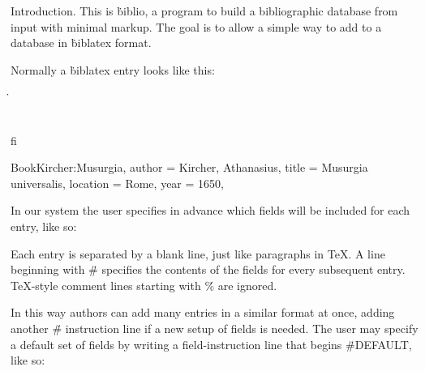 

Introduction.
This is \.{biblio}, a program to build a bibliographic database from input with
minimal markup.
The goal is to allow a simple way to add to a database in \.{biblatex} format.

Normally a \.{biblatex} entry looks like this:

\.{\\fi

Book{Kircher:Musurgia,
author   = {Kircher, Athanasius},
title    = {Musurgia universalis},
location = {Rome},
year     = 1650,
}}

In our system the user specifies in advance which fields will be included for
each entry, like so:


Each entry is separated by a blank line, just like paragraphs in \TeX.
A line beginning with \.{\#} specifies the contents of the fields for every
subsequent entry.
\TeX-style comment lines starting with \.{\%} are ignored.

In this way authors can add many entries in a similar format at once, adding
another \.{\#} instruction line if a new setup of fields is needed.
The user may specify a default set of fields by writing a field-instruction
line
that begins \.{\#DEFAULT}, like so:

